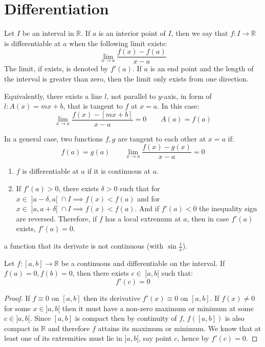 \thispagestyle{headings}
\chapter{Differentiation}
\begin{definition}
    Let \(I\) be an interval in \(\mathbb{R}\). If \(a\) is an interior point of \(I\), then we say that \(f: I \to \mathbb{R}\) is differentiable at \(a\) when the following limit exists:
    \[\lim_{x \to a} \dfrac{f(x) - f(a)}{x - a} \]
    The limit, if exists, is denoted by \(f'(a)\).
    If \(a\) is an end point and the length of the interval is greater than zero, then the limit only exists from one direction.

    Equivalently, there exists a line \(l\), not parallel to \(y\)-axis, in form of \(l : A(x) = mx + b\), that is tangent to \(f\) at \(x = a\). In this case:
    \[\lim_{x \to a}\dfrac{f(x) - [mx + b]}{x - a } = 0 \qquad A(a) = f(a) \]
\end{definition}
In a general case, two functions \(f,g\) are tangent to each other at \(x = a\) if:
\begin{equation}
    f(a) = g(a) \qquad \lim_{x \to a}{\dfrac{f(x) - g(x)}{x - a} = 0}
\end{equation}
\begin{corollary}\leavevmode
    \begin{enumerate}
        \item \(f\) is differentiable at \(a\) if it is continuous at \(a\).
        \item \label{extrma} If \(f'(a) > 0\), there exists \(\delta > 0\) such that for \(x \in \; ]a- \delta,a[\; \cap I \implies f(x) < f(a) \) and for \(x \in \; ]a, a +  \delta[\; \cap I \implies f(x) < f(a)\). And if \(f'(a) < 0\) the inequality sign are reversed. Therefore, if \(f\) has a local extremum at \(a\), then in case \(f'(a)\) exists, \(f'(a) = 0\).
    \end{enumerate}
\end{corollary}
\begin{example}
    a function that its derivate is not continuous (with \(\sin\frac{1}{x}\)).
\end{example}
\begin{theorem} \label{Rolle}
    Let \(f: [a,b] \to \mathbb{R}\) be a continuous and differentiable on the interval. If \(f(a) = 0, f(b) = 0\), then there exists \(c \in \; ]a,b[\) such that:
    \[f'(c) = 0\]
\end{theorem}
\begin{proof}
    If \(f \equiv 0\) on \([a,b]\) then its derivative \(f'(x) \equiv 0\) on \([a,b]\). If \(f(x) \neq 0\) for some \(x \in ]a,b[\) then it must have a non-zero maximum or minimum at some \(c \in ]a,b[\). Since \([a,b]\) is compact then by continuity of \(f\), \(f([a,b])\) is also compact in \(\mathbb{R}\) and therefore \(f\) attains its maximum or minimum. We know that at least one of its extremities must lie in \(]a,b[\), say point \(c\), hence by  \(f'(c) = 0\).
\end{proof}
